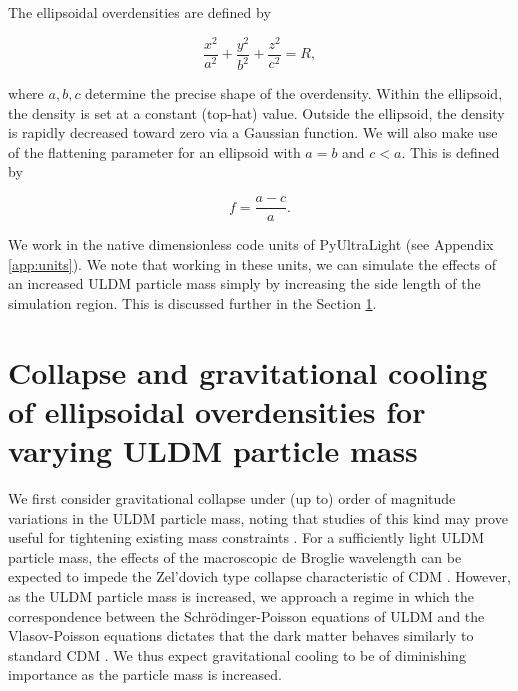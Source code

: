 \documentclass[a4paper,11pt]{article}
\begin{document}
The ellipsoidal overdensities are defined by

\begin{equation}\label{eq:ellipse}
    \frac{x^2}{a^2}+\frac{y^2}{b^2}+\frac{z^2}{c^2} = R,
\end{equation}

where $a, b, c$ determine the precise shape of the overdensity. Within the ellipsoid, the density is set at a constant (top-hat) value. Outside the ellipsoid, the density is rapidly decreased toward zero via a Gaussian function. We will also make use of the flattening parameter for an ellipsoid with $a = b$ and $c < a$. This is defined by

\begin{equation}\label{eq:flattening}
    f = \frac{a-c}{a}.
\end{equation}

We work in the native dimensionless code units of {\sc PyUltraLight} (see Appendix \ref{app:units}). We note that working in these units, we can simulate the effects of an increased ULDM particle mass simply by increasing the side length of the simulation region. This is discussed further in the Section \ref{sec:ULDM_mass}.



\section{Collapse and gravitational cooling of ellipsoidal overdensities for varying ULDM particle mass}\label{sec:ULDM_mass}

We first consider gravitational collapse under (up to) order of magnitude variations in the ULDM particle mass, noting that studies of this kind may prove useful for tightening existing mass constraints \cite{Marsh:2018zyw, Armengaud:2017nkf, Irsic:2017yje}. For a sufficiently light ULDM particle mass, the effects of the macroscopic de Broglie wavelength can be expected to impede the Zel'dovich type collapse characteristic of CDM \cite{Zeldovich:1969sb}. However, as the ULDM particle mass is increased, we approach a regime in which the correspondence between the Schr{\"o}dinger-Poisson equations of ULDM and the Vlasov-Poisson equations dictates that the dark matter behaves similarly to standard CDM \cite{Mocz:2018ium}. We thus expect gravitational cooling to be of diminishing importance as the particle mass is increased.
\end{document}
